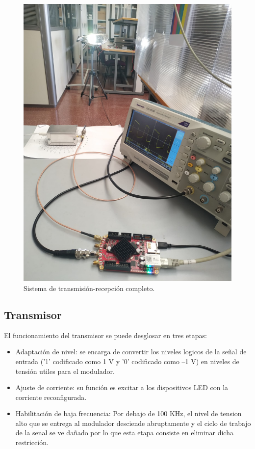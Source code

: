 \begin{figure}[ht]
    \centering
    \includegraphics[scale=0.15]{./figuras/Enlace.jpeg}
    \caption{\small{Sistema de transmisión-recepción completo.}}
    \label{enlace}%
\end{figure}

\subsection{Transmisor}
El funcionamiento del transmisor se puede desglosar en tres etapas:
\begin{itemize}
    \item Adaptación de nivel: se encarga de convertir los niveles logicos de la señal 
    de entrada ('1' codificado como 1 V y '0' codificado como –1 V) en niveles de tensión 
    utiles para el modulador.
    \item Ajuste de corriente: su función es excitar a los dispositivos
    LED con la corriente reconfigurada.
    \item Habilitación de baja frecuencia: Por debajo de 100 KHz, el nivel de tension alto 
    que se entrega al modulador desciende abruptamente y el ciclo de trabajo de la senal se 
    ve dañado por lo que esta etapa consiste en eliminar dicha restricción.
\end{itemize}

